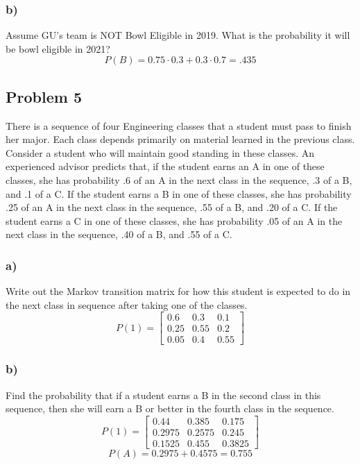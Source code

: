 \documentclass{article}
\begin{document}
\subsubsection*{b)}
Assume GU’s team is NOT Bowl Eligible in 2019. What is the probability it will be bowl eligible in 2021?
\begin{equation}
    P(B) = 0.75 \cdot 0.3  + 0.3 \cdot 0.7 = \boxed{.435}
\end{equation}
\subsection*{Problem 5}
There is a sequence of four Engineering classes that a student must pass to finish her major. Each class depends primarily on material learned in the previous class. Consider a student who will maintain good standing in these classes. An experienced advisor predicts that, if the student earns an A in one of these classes, she has probability .6 of an A in the next class in the sequence, .3 of a B, and .1 of a C. If the student earns a B in one of these classes, she has probability .25 of an A in the next class in the sequence, .55 of a B, and .20 of a C. If the student earns a C in one of these classes, she has probability .05 of an A in the next class in the sequence, .40 of a B, and .55 of a C.
\subsubsection*{a)}
Write out the Markov transition matrix for how this student is expected to do in the next class in sequence after taking one of the classes.
\begin{equation}
    P(1) = 
    \begin{bmatrix}
    0.6 & 0.3 & 0.1\\
    0.25 & 0.55 & 0.2\\
    0.05 & 0.4 & 0.55
    \end{bmatrix}
\end{equation}
\subsubsection*{b)}
Find the probability that if a student earns a B in the second class in this sequence, then she will earn a B or better in the fourth class in the sequence.
\begin{equation}
    P(1) = 
    \begin{bmatrix}
    0.44 & 0.385 & 0.175\\
    0.2975 & 0.2575 & 0.245\\
    0.1525 & 0.455 & 0.3825
    \end{bmatrix}
\end{equation}
\begin{equation}
    P(A) = 0.2975 + 0.4575 = \boxed{0.755}
\end{equation}
\end{document}
